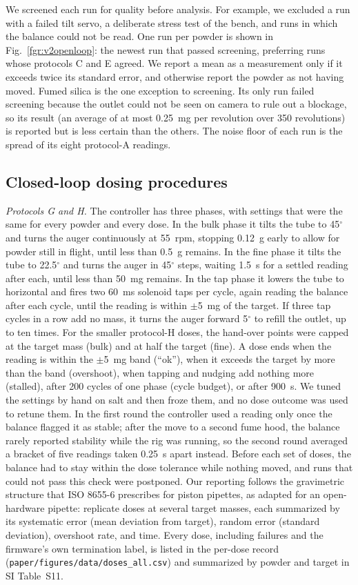 \documentclass[twoside,twocolumn,9pt]{article}
\begin{document}
We screened each run for quality before analysis. For example, we excluded a run with a failed tilt servo, a deliberate stress test of the bench, and runs in which the balance could not be read. One run per powder is shown in Fig.~\ref{fgr:v2openloop}: the newest run that passed screening, preferring runs whose protocols C and E agreed. We report a mean as a measurement only if it exceeds twice its standard error, and otherwise report the powder as not having moved. Fumed silica is the one exception to screening. Its only run failed screening because the outlet could not be seen on camera to rule out a blockage, so its result (an average of at most 0.25~mg per revolution over 350 revolutions) is reported but is less certain than the others. The noise floor of each run is the spread of its eight protocol-A readings.

\subsection{Closed-loop dosing procedures}
\emph{Protocols G and H.} The controller has three phases, with settings that were the same for every powder and every dose. In the bulk phase it tilts the tube to 45$^\circ$ and turns the auger continuously at 55~rpm, stopping 0.12~g early to allow for powder still in flight, until less than 0.5~g remains. In the fine phase it tilts the tube to 22.5$^\circ$ and turns the auger in 45$^\circ$ steps, waiting 1.5~s for a settled reading after each, until less than 50~mg remains. In the tap phase it lowers the tube to horizontal and fires two 60~ms solenoid taps per cycle, again reading the balance after each cycle, until the reading is within $\pm$5~mg of the target. If three tap cycles in a row add no mass, it turns the auger forward 5$^\circ$ to refill the outlet, up to ten times. For the smaller protocol-H doses, the hand-over points were capped at the target mass (bulk) and at half the target (fine). A dose ends when the reading is within the $\pm$5~mg band (``ok''), when it exceeds the target by more than the band (overshoot), when tapping and nudging add nothing more (stalled), after 200 cycles of one phase (cycle budget), or after 900~s. We tuned the settings by hand on salt and then froze them, and no dose outcome was used to retune them. In the first round the controller used a reading only once the balance flagged it as stable; after the move to a second fume hood, the balance rarely reported stability while the rig was running, so the second round averaged a bracket of five readings taken 0.25~s apart instead. Before each set of doses, the balance had to stay within the dose tolerance while nothing moved, and runs that could not pass this check were postponed. Our reporting follows the gravimetric structure that ISO 8655-6 prescribes for piston pipettes, as adapted for an open-hardware pipette:\cite{Yoshikawa2023Pipette,Yoshikawa2026Commit} replicate doses at several target masses, each summarized by its systematic error (mean deviation from target), random error (standard deviation), overshoot rate, and time. Every dose, including failures and the firmware's own termination label, is listed in the per-dose record (\texttt{paper/figures/data/doses\_all.csv}) and summarized by powder and target in SI Table~S11.
\end{document}
